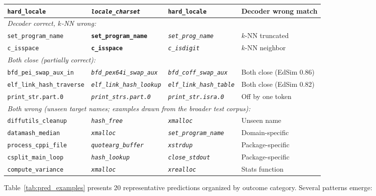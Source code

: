 \documentclass[sigconf,nonacm]{acmart}
\begin{document}
\begin{table}[t]
{\begin{tabular}{llll}
        \texttt{hard\_locale} & \textit{\texttt{locale\_charset}} & \textbf{\texttt{hard\_locale}} & Decoder wrong match \\
        \midrule
        \multicolumn{4}{l}{\textit{Decoder correct, $k$-NN wrong:}} \\
        \texttt{set\_program\_name} & \textbf{\texttt{set\_program\_name}} & \textit{\texttt{set\_prog\_name}} & $k$-NN truncated \\
        \texttt{c\_isspace} & \textbf{\texttt{c\_isspace}} & \textit{\texttt{c\_isdigit}} & $k$-NN neighbor \\
        \midrule
        \multicolumn{4}{l}{\textit{Both close (partially correct):}} \\
        \texttt{bfd\_pei\_swap\_aux\_in} & \textit{\texttt{bfd\_pex64i\_swap\_aux}} & \textit{\texttt{bfd\_coff\_swap\_aux}} & Both close (EdSim 0.86) \\
        \texttt{elf\_link\_hash\_traverse} & \textit{\texttt{elf\_link\_hash\_lookup}} & \textit{\texttt{elf\_link\_hash\_table}} & Both close (EdSim 0.82) \\
        \texttt{print\_str.part.0} & \textit{\texttt{print\_strs.part.0}} & \textit{\texttt{print\_str.isra.0}} & Off by one token \\
        \midrule
        \multicolumn{4}{l}{\textit{Both wrong (unseen target names; examples drawn from the broader test corpus):}} \\
        \texttt{diffutils\_cleanup} & \textit{\texttt{hash\_free}} & \textit{\texttt{xmalloc}} & Unseen name \\
        \texttt{datamash\_median} & \textit{\texttt{xmalloc}} & \textit{\texttt{set\_program\_name}} & Domain-specific \\
        \texttt{process\_cppi\_file} & \textit{\texttt{quotearg\_buffer}} & \textit{\texttt{xstrdup}} & Package-specific \\
        \texttt{csplit\_main\_loop} & \textit{\texttt{hash\_lookup}} & \textit{\texttt{close\_stdout}} & Package-specific \\
        \texttt{compute\_variance} & \textit{\texttt{xmalloc}} & \textit{\texttt{xrealloc}} & Stats function \\
        \bottomrule
    \end{tabular}%
    }
\end{table}

Table~\ref{tab:pred_examples} presents 20 representative predictions organized by outcome category. Several patterns emerge:
\end{document}
